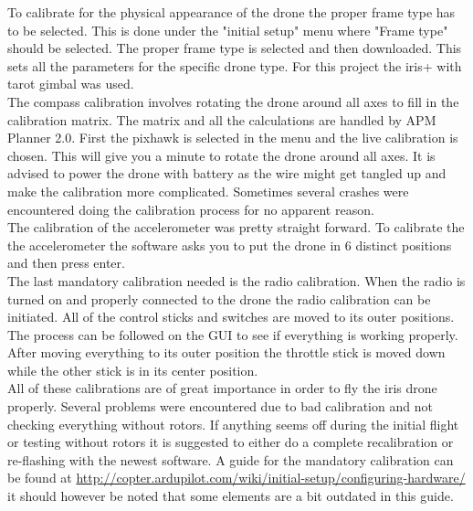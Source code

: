 To calibrate for the physical appearance of the drone the proper frame type has to be selected. This is done under the "initial setup" menu where "Frame type" should be selected. The proper frame type is selected and then downloaded. This sets all the parameters for the specific drone type. For this project the iris+ with tarot gimbal was used.\\

The compass calibration involves rotating the drone around all axes to fill in the calibration matrix. The matrix and all the calculations are handled by APM Planner 2.0. First the pixhawk is selected in the menu and the live calibration is chosen. This will give you a minute to rotate the drone around all axes. It is advised to power the drone with battery as the wire might get tangled up and make the calibration more complicated. Sometimes several crashes were encountered doing the calibration process for no apparent reason.\\

The calibration of the accelerometer was pretty straight forward. To calibrate the the accelerometer the software asks you to put the drone in 6 distinct positions and then press enter.\\

The last mandatory calibration needed is the radio calibration. When the radio is turned on and properly connected to the drone the radio calibration can be initiated. All of the control sticks and switches are moved to its outer positions.  The process can be followed on the GUI to see if everything is working properly. After moving everything to its outer position the throttle stick is moved down while the other stick is in its center position.\\

All of these calibrations are of great importance in order to fly the iris drone properly. Several problems were encountered due to bad calibration and not checking everything without rotors. If anything seems off during the initial flight or testing without rotors it is suggested to either do a complete recalibration or re-flashing with the newest software. A guide for the mandatory calibration can be found at \url{http://copter.ardupilot.com/wiki/initial-setup/configuring-hardware/} it should however be noted that some elements are a bit outdated in this guide.

